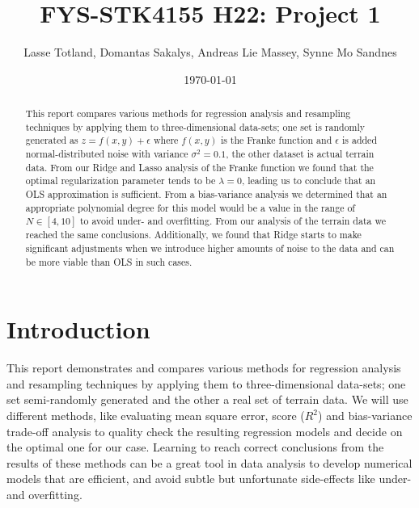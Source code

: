 \documentclass[reprint,english,notitlepage]{revtex4-1}  %
\begin{document}
\title{FYS-STK4155 H22: Project 1}
\author{Lasse Totland, Domantas Sakalys, Andreas Lie Massey, Synne Mo Sandnes}
\date{\today}      %
\noaffiliation                            %
\begin{abstract} %
This report compares various methods for regression analysis and resampling techniques by applying them to three-dimensional data-sets; one set is randomly generated as $z = f(x,y) + \epsilon$ where $f(x,y)$ is the Franke function and $\epsilon$ is added normal-distributed noise with variance $\sigma^2 = 0.1$, the other dataset is actual terrain data. From our Ridge and Lasso analysis of the Franke function we found that the optimal regularization parameter tends to be $\lambda = 0$, leading us to conclude that an OLS approximation is sufficient. From a bias-variance analysis we determined that an appropriate polynomial degree for this model would be a value in the range of $N \in [4, 10]$ to avoid under- and overfitting. From our analysis of the terrain data we reached the same conclusions. Additionally, we found that Ridge starts to make significant adjustments when we introduce higher amounts of noise to the data and can be more viable than OLS in such cases.
\end{abstract}                            %
\maketitle                                %



\section{Introduction} 

This report demonstrates and compares various methods for regression analysis and resampling techniques by applying them to three-dimensional data-sets; one set semi-randomly generated and the other a real set of terrain data. We will use different methods, like evaluating mean square error, score ($R^2$) and bias-variance trade-off analysis to quality check the resulting regression models and decide on the optimal one for our case. Learning to reach correct conclusions from the results of these methods can be a great tool in data analysis to develop numerical models that are efficient, and avoid subtle but unfortunate side-effects like under- and overfitting.
\end{document}
